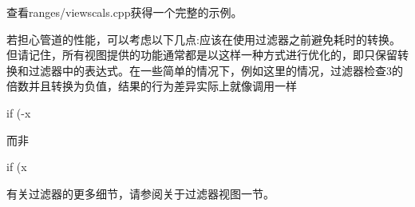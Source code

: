 查看ranges/viewscals.cpp获得一个完整的示例。

若担心管道的性能，可以考虑以下几点:应该在使用过滤器之前避免耗时的转换。但请记住，所有视图提供的功能通常都是以这样一种方式进行优化的，即只保留转换和过滤器中的表达式。在一些简单的情况下，例如这里的情况，过滤器检查3的倍数并且转换为负值，结果的行为差异实际上就像调用一样

\begin{cpp}
if (-x %
\end{cpp}

而非

\begin{cpp}
if (x %
\end{cpp}

有关过滤器的更多细节，请参阅关于过滤器视图一节。

